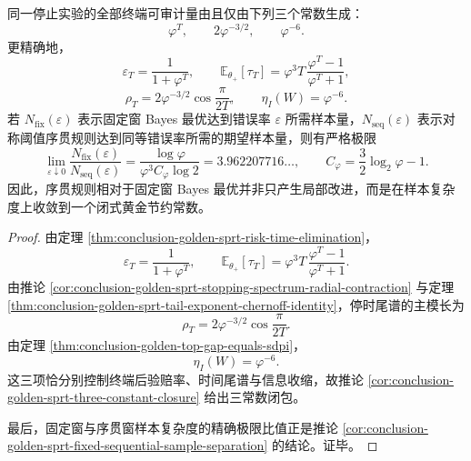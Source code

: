 \begin{theorem}[停止实验的三常数闭包与黄金样本节约常数]\label{thm:conclusion-endpoint-stopping-three-constant-golden-saving}
同一停止实验的全部终端可审计量由且仅由下列三个常数生成：
\[
\varphi^T,
\qquad
2\varphi^{-3/2},
\qquad
\varphi^{-6}.
\]
更精确地，
\[
\varepsilon_T=\frac{1}{1+\varphi^T},
\qquad
\mathbb E_{\theta_+}[\tau_T]
=
\varphi^3 T\,\frac{\varphi^T-1}{\varphi^T+1},
\]
\[
\rho_T=2\varphi^{-3/2}\cos\frac{\pi}{2T},
\qquad
\eta_I(W)=\varphi^{-6}.
\]
若 \(N_{\mathrm{fix}}(\varepsilon)\) 表示固定窗 Bayes 最优达到错误率 \(\varepsilon\) 所需样本量，\(N_{\mathrm{seq}}(\varepsilon)\) 表示对称阈值序贯规则达到同等错误率所需的期望样本量，则有严格极限
\[
\lim_{\varepsilon\downarrow 0}
\frac{N_{\mathrm{fix}}(\varepsilon)}{N_{\mathrm{seq}}(\varepsilon)}
=
\frac{\log\varphi}{\varphi^3 C_\varphi\log 2}
=
3.962207716\ldots,
\qquad
C_\varphi=\frac32\log_2\varphi-1.
\]
因此，序贯规则相对于固定窗 Bayes 最优并非只产生局部改进，而是在样本复杂度上收敛到一个闭式黄金节约常数。
\end{theorem}
\begin{proof}
由定理 \ref{thm:conclusion-golden-sprt-risk-time-elimination}，
\[
\varepsilon_T=\frac{1}{1+\varphi^T},
\qquad
\mathbb E_{\theta_+}[\tau_T]
=
\varphi^3 T\,\frac{\varphi^T-1}{\varphi^T+1}.
\]
由推论 \ref{cor:conclusion-golden-sprt-stopping-spectrum-radial-contraction} 与定理 \ref{thm:conclusion-golden-sprt-tail-exponent-chernoff-identity}，停时尾谱的主模长为
\[
\rho_T=2\varphi^{-3/2}\cos\frac{\pi}{2T}.
\]
由定理 \ref{thm:conclusion-golden-top-gap-equals-sdpi}，
\[
\eta_I(W)=\varphi^{-6}.
\]
这三项恰分别控制终端后验赔率、时间尾谱与信息收缩，故推论 \ref{cor:conclusion-golden-sprt-three-constant-closure} 给出三常数闭包。

最后，固定窗与序贯窗样本复杂度的精确极限比值正是推论 \ref{cor:conclusion-golden-sprt-fixed-sequential-sample-separation} 的结论。证毕。
\end{proof}

